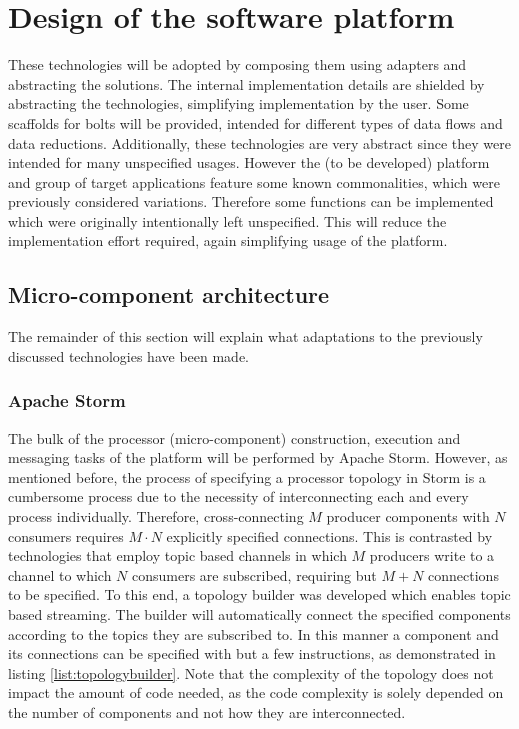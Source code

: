 \section{Design of the software platform}
These technologies will be adopted by composing them using adapters and abstracting the solutions. The internal implementation details are shielded by abstracting the technologies, simplifying implementation by the user. Some scaffolds for bolts will be provided, intended for different types of data flows and data reductions. Additionally, these technologies are very abstract since they were intended for many unspecified usages. However the (to be developed) platform and group of target applications feature some known commonalities, which were previously considered variations. Therefore some functions can be implemented which were originally intentionally left unspecified. This will reduce the implementation effort required, again simplifying usage of the platform.

\subsection{Micro-component architecture}
The remainder of this section will explain what adaptations to the previously discussed technologies have been made.

\subsubsection*{Apache Storm}
The bulk of the processor (micro-component) construction, execution and messaging tasks of the platform will be performed by Apache Storm. However, as mentioned before, the process of specifying a processor topology in Storm is a cumbersome process due to the necessity of interconnecting each and every process individually. Therefore, cross-connecting $M$ producer components with $N$ consumers requires $M\cdot N$ explicitly specified connections. This is contrasted by technologies that employ topic based channels in which $M$ producers write to a channel to which $N$ consumers are subscribed, requiring but $M+N$ connections to be specified. To this end, a topology builder was developed which enables topic based streaming. The builder will automatically connect the specified components according to the topics they are subscribed to. In this manner a component and its connections can be specified with but a few instructions, as demonstrated in listing \ref{list:topologybuilder}. Note that the complexity of the topology does not impact the amount of code needed, as the code complexity is solely depended on the number of components and not how they are interconnected.

